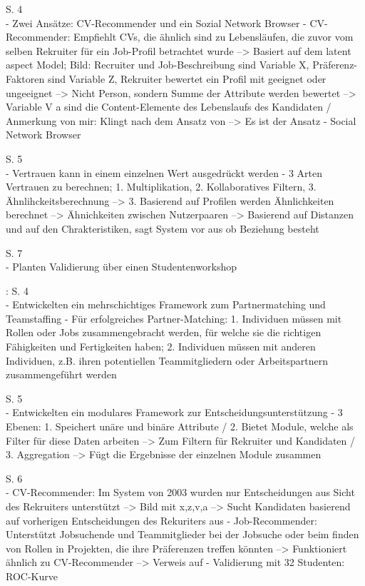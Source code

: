 S. 4\\
- Zwei Ansätze: CV-Recommender und ein Sozial Network Browser
- CV-Recommender: Empfiehlt CVs, die ähnlich sind zu Lebensläufen, die zuvor vom selben Rekruiter für ein Job-Profil betrachtet wurde --> Basiert auf dem latent aspect Model; Bild: Recruiter und Job-Beschreibung sind Variable X, Präferenz-Faktoren sind Variable Z, Rekruiter bewertet ein Profil mit geeignet oder ungeeignet --> Nicht Person, sondern Summe der Attribute werden bewertet --> Variable V a sind die Content-Elemente des Lebenslaufs des Kandidaten / Anmerkung von mir: Klingt nach dem Ansatz von \textcite{faerber:2003} --> Es ist der Ansatz
- Social Network Browser

S. 5\\
- Vertrauen kann in einem einzelnen Wert ausgedrückt werden
- 3 Arten Vertrauen zu berechnen; 1. Multiplikation, 2. Kollaboratives Filtern, 3. Ähnlihckeitsberechnung --> 3. Basierend auf Profilen werden Ähnlichkeiten berechnet --> Ähnichkeiten zwischen Nutzerpaaren --> Basierend auf Distanzen und auf den Chrakteristiken, sagt System vor aus ob Beziehung besteht

S. 7\\
- Planten Validierung über einen Studentenworkshop

\textcite{keim:2007}:
S. 4\\
- Entwickelten ein mehrschichtiges Framework zum Partnermatching und Teamstaffing
- Für erfolgreiches Partner-Matching: 1. Individuen müssen mit Rollen oder Jobs zusammengebracht werden, für welche sie die richtigen Fähigkeiten und Fertigkeiten haben; 2. Individuen müssen mit anderen Individuen, z.B. ihren potentiellen Teammitgliedern oder Arbeitspartnern zusammengeführt werden

S. 5\\
- Entwickelten ein modulares Framework zur Entscheidungsunterstützung
- 3 Ebenen: 1. Speichert unäre und binäre Attribute / 2. Bietet Module, welche als Filter für diese Daten arbeiten --> Zum Filtern für Rekruiter und Kandidaten / 3. Aggregation --> Fügt die Ergebnisse der einzelnen Module zusammen

S. 6\\
- CV-Recommender: Im System von 2003 wurden nur Entscheidungen aus Sicht des Rekruiters unterstützt --> Bild mit x,z,v,a --> Sucht Kandidaten basierend auf vorherigen Entscheidungen des Rekuriters aus
- Job-Recommender: Unterstützt Jobsuchende und Teammitglieder bei der Jobsuche oder beim finden von Rollen in Projekten, die ihre Präferenzen treffen könnten --> Funktioniert ähnlich zu CV-Recommender --> Verweis auf \textcite{malinowski:2006}
- Validierung mit 32 Studenten: ROC-Kurve

